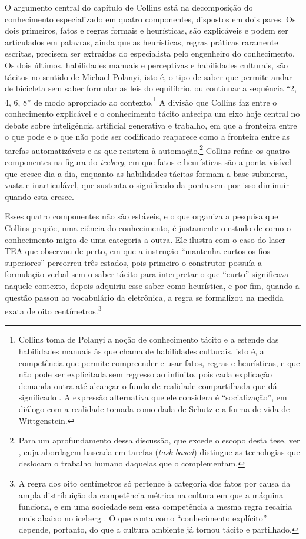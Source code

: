 O argumento central do capítulo de Collins está na decomposição do conhecimento especializado em quatro componentes, dispostos em dois pares. Os dois primeiros, fatos e regras formais e heurísticas, são explicáveis e podem ser articulados em palavras, ainda que as heurísticas, regras práticas raramente escritas, precisem ser extraídas do especialista pelo engenheiro do conhecimento. Os dois últimos, habilidades manuais e perceptivas e habilidades culturais, são tácitos no sentido de Michael Polanyi, isto é, o tipo de saber que permite andar de bicicleta sem saber formular as leis do equilíbrio, ou continuar a sequência \enquote{2, 4, 6, 8} de modo apropriado ao contexto.\footnote{Collins toma de Polanyi a noção de conhecimento tácito e a estende das habilidades manuais às que chama de habilidades culturais, isto é, a competência que permite compreender e usar fatos, regras e heurísticas, e que não pode ser explicitada sem regresso ao infinito, pois cada explicação demanda outra até alcançar o fundo de realidade compartilhada que dá significado \parencite[pp.~328--329]{Collins2012Expert}. A expressão alternativa que ele considera é \enquote{socialização}, em diálogo com a realidade tomada como dada de Schutz e a forma de vida de Wittgenstein.} A divisão que Collins faz entre o conhecimento explicável e o conhecimento tácito antecipa um eixo hoje central no debate sobre inteligência artificial generativa e trabalho, em que a fronteira entre o que pode e o que não pode ser codificado reaparece como a fronteira entre as tarefas automatizáveis e as que resistem à automação.\footnote{Para um aprofundamento dessa discussão, que excede o escopo desta tese, ver \textcite{AcemogluJohnson2023}, cuja abordagem baseada em tarefas (\textit{task-based}) distingue as tecnologias que deslocam o trabalho humano daquelas que o complementam.} Collins reúne os quatro componentes na figura do \textit{iceberg}, em que fatos e heurísticas são a ponta visível que cresce dia a dia, enquanto as habilidades tácitas formam a base submersa, vasta e inarticulável, que sustenta o significado da ponta sem por isso diminuir quando esta cresce.

Esses quatro componentes não são estáveis, e o que organiza a pesquisa que Collins propõe, uma ciência do conhecimento, é justamente o estudo de como o conhecimento migra de uma categoria a outra. Ele ilustra com o caso do laser TEA que observou de perto, em que a instrução \enquote{mantenha curtos os fios superiores} percorreu três estados, pois primeiro o construtor possuía a formulação verbal sem o saber tácito para interpretar o que \enquote{curto} significava naquele contexto, depois adquiriu esse saber como heurística, e por fim, quando a questão passou ao vocabulário da eletrônica, a regra se formalizou na medida exata de oito centímetros.\footnote{A regra dos oito centímetros só pertence à categoria dos fatos por causa da ampla distribuição da competência métrica na cultura em que a máquina funciona, e em uma sociedade sem essa competência a mesma regra recairia mais abaixo no iceberg \parencite[pp.~332--333]{Collins2012Expert}. O que conta como \enquote{conhecimento explícito} depende, portanto, do que a cultura ambiente já tornou tácito e partilhado.}


